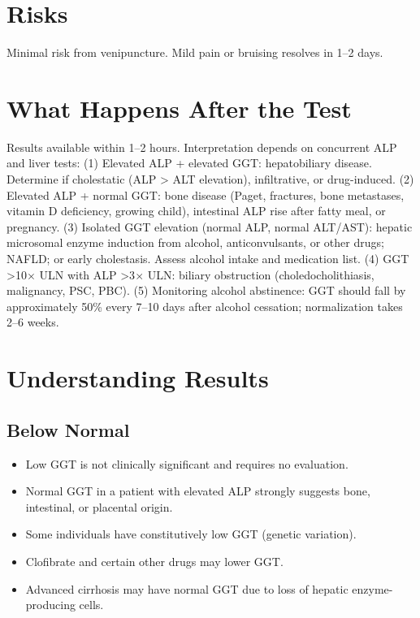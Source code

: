 \section*{Risks}
Minimal risk from venipuncture. Mild pain or bruising resolves in 1--2 days.

\section*{What Happens After the Test}
Results available within 1--2 hours. Interpretation depends on concurrent ALP and liver tests: (1) Elevated ALP + elevated GGT: hepatobiliary disease. Determine if cholestatic (ALP > ALT elevation), infiltrative, or drug-induced. (2) Elevated ALP + normal GGT: bone disease (Paget, fractures, bone metastases, vitamin D deficiency, growing child), intestinal ALP rise after fatty meal, or pregnancy. (3) Isolated GGT elevation (normal ALP, normal ALT/AST): hepatic microsomal enzyme induction from alcohol, anticonvulsants, or other drugs; NAFLD; or early cholestasis. Assess alcohol intake and medication list. (4) GGT >10$\times$ ULN with ALP >3$\times$ ULN: biliary obstruction (choledocholithiasis, malignancy, PSC, PBC). (5) Monitoring alcohol abstinence: GGT should fall by approximately 50\% every 7--10 days after alcohol cessation; normalization takes 2--6 weeks.

\section*{Understanding Results}

\subsection*{Below Normal}
\begin{itemize}
  \item Low GGT is not clinically significant and requires no evaluation.
  \item Normal GGT in a patient with elevated ALP strongly suggests bone, intestinal, or placental origin.
  \item Some individuals have constitutively low GGT (genetic variation).
  \item Clofibrate and certain other drugs may lower GGT.
  \item Advanced cirrhosis may have normal GGT due to loss of hepatic enzyme-producing cells.
\end{itemize}

